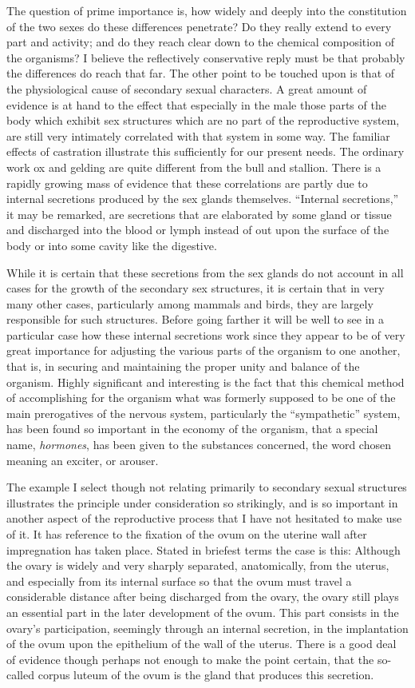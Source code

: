 \documentclass[a4paper, 11pt, oneside, polutonikogreek, english]{article}
\begin{document}
The question of prime importance is, how widely and deeply into the constitution of the two sexes do these differences penetrate? Do they really extend to every part and activity; and do they reach clear down to the chemical composition of the organisms? I believe the reflectively conservative reply must be that probably the differences do reach that far. The other point to be touched upon is that of the physiological cause of secondary sexual characters. A great amount of evidence is at hand to the effect that especially in the male those parts of the body which exhibit sex structures which are no part of the reproductive system, are still very intimately correlated with that system in some way. The familiar effects of castration illustrate this sufficiently for our present needs. The ordinary work ox and gelding are quite different from the bull and stallion. There is a rapidly growing mass of evidence that these correlations are partly due to internal secretions produced by the sex glands themselves. ``Internal secretions,'' it may be remarked, are secretions that are elaborated by some gland or tissue and discharged into the blood or lymph instead of out upon the surface of the body or into some cavity like the digestive.

While it is certain that these secretions from the sex glands do not account in all cases for the growth of the secondary sex structures, it is certain that in very many other cases, particularly among mammals and birds, they are largely responsible for such structures. Before going farther it will be well to see in a particular case how these internal secretions work since they appear to be of very great importance for adjusting the various parts of the organism to one another, that is, in securing and maintaining the proper unity and balance of the organism. Highly significant and interesting is the fact that this chemical method of accomplishing for the organism what was formerly supposed to be one of the main prerogatives of the nervous system, particularly the ``sympathetic'' system, has been found so important in the economy of the organism, that a special name, \emph{hormones}, has been given to the substances concerned, the word chosen meaning an exciter, or arouser.

The example I select though not relating primarily to secondary sexual structures illustrates the principle under consideration so strikingly, and is so important in another aspect of the reproductive process that I have not hesitated to make use of it. It has reference to the fixation of the ovum on the uterine wall after impregnation has taken place. Stated in briefest terms the case is this: Although the ovary is widely and very sharply separated, anatomically, from the uterus, and especially from its internal surface so that the ovum must travel a considerable distance after being discharged from the ovary, the ovary still plays an essential part in the later development of the ovum. This part consists in the ovary's participation, seemingly through an internal secretion, in the implantation of the ovum upon the epithelium of the wall of the uterus. There is a good deal of evidence though perhaps not enough to make the point certain, that the so-called corpus luteum of the ovum is the gland that produces this secretion.
\end{document}
